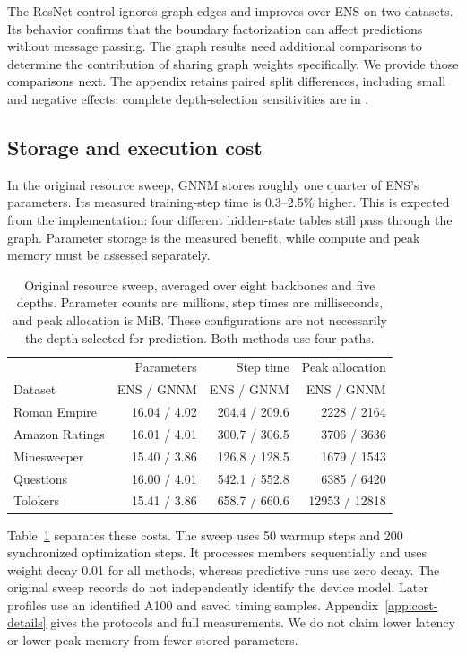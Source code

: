 \documentclass{article}
\begin{document}
The ResNet control ignores graph edges and improves over ENS on two datasets. Its behavior confirms that the boundary factorization can affect predictions without message passing. The graph results need additional comparisons to determine the contribution of sharing graph weights specifically. We provide those comparisons next. The appendix retains paired split differences, including small and negative effects; complete depth-selection sensitivities are in .

\subsection{Storage and execution cost}
In the original resource sweep, GNNM stores roughly one quarter of ENS's parameters. Its measured training-step time is 0.3--2.5\% higher. This is expected from the implementation: four different hidden-state tables still pass through the graph. Parameter storage is the measured benefit, while compute and peak memory must be assessed separately.

\begin{table}[t]
\centering\small
\setlength{\tabcolsep}{4pt}
\caption{Original resource sweep, averaged over eight backbones and five depths. Parameter counts are millions, step times are milliseconds, and peak allocation is MiB. These configurations are not necessarily the depth selected for prediction. Both methods use four paths.}
\label{tab:resource-main}
\begin{tabular}{lrrr}
\toprule
& Parameters & Step time & Peak allocation\\
Dataset & ENS / GNNM & ENS / GNNM & ENS / GNNM\\
\midrule
Roman Empire & 16.04 / 4.02 & 204.4 / 209.6 & 2228 / 2164\\
Amazon Ratings & 16.01 / 4.01 & 300.7 / 306.5 & 3706 / 3636\\
Minesweeper & 15.40 / 3.86 & 126.8 / 128.5 & 1679 / 1543\\
Questions & 16.00 / 4.01 & 542.1 / 552.8 & 6385 / 6420\\
Tolokers & 15.41 / 3.86 & 658.7 / 660.6 & 12953 / 12818\\
\bottomrule
\end{tabular}
\end{table}

Table~\ref{tab:resource-main} separates these costs. The sweep uses 50 warmup steps and 200 synchronized optimization steps. It processes members sequentially and uses weight decay 0.01 for all methods, whereas predictive runs use zero decay. The original sweep records do not independently identify the device model. Later profiles use an identified A100 and saved timing samples. Appendix~\ref{app:cost-details} gives the protocols and full measurements. We do not claim lower latency or lower peak memory from fewer stored parameters.
\end{document}
